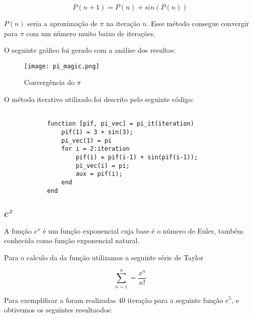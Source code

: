 			\begin{equation}
			\label{magic_equation}
				P(n+1) = P(n) + sin(P(n))
			\end{equation}

			$P(n)$ seria a aproximação de $\pi$ na iteração $n$. Esse método
			consegue convergir para $\pi$ com um número muito baixo de
			iterações.

			

			O seguinte gráfico foi gerado com a análise dos resultos:

			\begin{figure}[H]
				\centering
				\texttt{[image: pi\_magic.png]}
				\caption{Convergência do $\pi$}
				\label{fig:pi-magic}
			\end{figure}

			O método iterativo utilizado foi descrito pelo seguinte código:

			\begin{lstlisting}

			function [pif, pi_vec] = pi_it(iteration)
				pif(1) = 3 + sin(3);
				pi_vec(1) = pi
				for i = 2:iteration
					pif(i) = pif(i-1) + sin(pif(i-1));
					pi_vec(i) = pi;
					aux = pif(i);
				end
			end

			\end{lstlisting}

	\subsection{$e^x$}

		A função $e^x$ é um função exponencial cuja base é o número de Euler,
		também conhecida como função exponencial natural.

		Para o calculo da da função utilizamos a seguinte série de Taylor
		
		\begin{equation}
			\sum_{n=1}^{n} = \frac{x^n}{n!}
		\end{equation}

		Para exemplificar a foram realizadas 40 iteração para a seguinte função
		$e^5$, e obtivemos os seguintes resultaodos:

